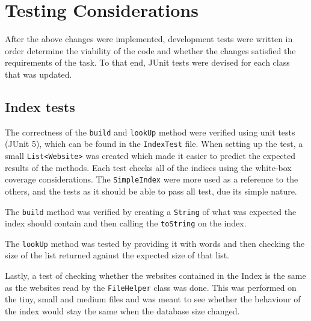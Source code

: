 \section{Testing Considerations}
After the above changes were implemented, development tests were written in order determine the viability of the code and whether the changes satisfied the requirements of the task. To that end, JUnit tests were devised for each class that was updated.

\subsection{Index tests}
The correctness of the {\tt build} and {\tt lookUp} method were verified using unit tests (JUnit 5), which can be found in the {\tt IndexTest} file.
When setting up the test, a small {\tt List<Website>} was created which made it easier to predict the expected results of the methods. Each test
checks all of the indices using the white-box coverage considerations. The {\tt SimpleIndex} were more used as a reference to the others, and the
tests as it should be able to pass all test, due its simple nature.

The {\tt build} method was verified by creating a {\tt String} of what was expected the index should contain and then calling the {\tt toString} on
the index.

The {\tt lookUp} method was tested by providing it with words and then checking the size of the list returned against the expected size of that list.

Lastly, a test of checking whether the websites contained in the Index is the same as the websites read by the {\tt FileHelper} class was done.
This was performed on the tiny, small and medium files and was meant to see whether the behaviour of the index would stay the same when the
database size changed.



